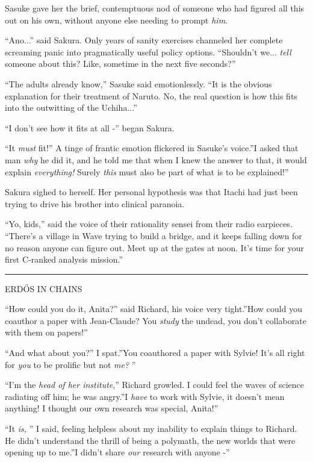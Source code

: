 Sasuke gave her the brief, contemptuous nod of someone who had figured
all this out on his own, without anyone else needing to prompt
\emph{him}.

``Ano...'' said Sakura. Only years of sanity exercises channeled
her complete screaming panic into pragmatically useful policy options.
``Shouldn't we... \emph{tell} someone about this? Like, sometime in
the next five seconds?''

``The adults already know,'' Sasuke said emotionlessly. ``It is the
obvious explanation for their treatment of Naruto. No, the real question
is how this fits into the outwitting of the Uchiha...''

``I don't see how it fits at all -'' began Sakura.

``It \emph{must} fit!'' A tinge of frantic emotion flickered in Sasuke's
voice.''I asked that man \emph{why} he did it, and he told me that when
I knew the answer to that, it would explain \emph{everything!} Surely
\emph{this} must also be part of what is to be explained!''

Sakura sighed to herself. Her personal hypothesis was that Itachi had
just been trying to drive his brother into clinical paranoia.

``Yo, kids,'' said the voice of their rationality sensei from their
radio earpieces. ``There's a village in Wave trying to build a bridge,
and it keeps falling down for no reason anyone can figure out. Meet up
at the gates at noon. It's time for your first C-ranked analysis
mission.''

\begin{center}\rule{3in}{0.4pt}\end{center}

ERDŐS IN CHAINS

``How could you do it, Anita?'' said Richard, his voice very tight.''How
could you coauthor a paper with Jean-Claude? You \emph{study} the
undead, you don't collaborate with them on papers!''

``And what about you?'' I spat.''You coauthored a paper with Sylvie!
It's all right for \emph{you} to be prolific but not \emph{me?} ''

``I'm the \emph{head of her institute},'' Richard growled. I could feel
the waves of science radiating off him; he was angry.''I \emph{have} to
work with Sylvie, it doesn't mean anything! I thought our own research
was special, Anita!''

``It \emph{is,} '' I said, feeling helpless about my inability to explain
things to Richard. He didn't understand the thrill of being a polymath,
the new worlds that were opening up to me.''I didn't share \emph{our}
research with anyone -''


